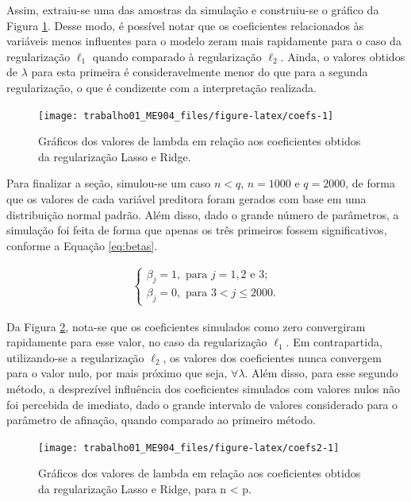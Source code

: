 \documentclass[
  12pt,
]{article}
\begin{document}
\quad Assim, extraiu-se uma das amostras da simulação e construiu-se o
gráfico da Figura \ref{fig:coefs}. Desse modo, é possível notar que os
coeficientes relacionados às variáveis menos influentes para o modelo
zeram mais rapidamente para o caso da regularização \(\ell_1\) quando
comparado à regularização \(\ell_2\). Ainda, o valores obtidos de
\(\lambda\) para esta primeira é consideravelmente menor do que para a
segunda regularização, o que é condizente com a interpretação realizada.

\begin{figure}

{\centering \texttt{[image: trabalho01\_ME904\_files/figure-latex/coefs-1]} 

}

\caption{Gráficos dos valores de lambda em relação aos coeficientes obtidos da regularização Lasso e Ridge.}\label{fig:coefs}
\end{figure}

\newpage

\quad Para finalizar a seção, simulou-se um caso \(n<q\), \(n = 1000\) e
\(q = 2000\), de forma que os valores de cada variável preditora foram
gerados com base em uma distribuição normal padrão. Além disso, dado o
grande número de parâmetros, a simulação foi feita de forma que apenas
os três primeiros fossem significativos, conforme a Equação
\ref{eq:betas}.

\begin{eqnarray}
\label{eq:betas}
\begin{cases}
\beta_j = 1, \text{ para } j = 1, 2 \text{ e } 3; \\
\beta_j = 0, \text{ para } 3 < j \leq 2000.
\end{cases}
\end{eqnarray}

\quad Da Figura \ref{fig:coefs2}, nota-se que os coeficientes simulados
como zero convergiram rapidamente para esse valor, no caso da
regularização \(\ell_1\). Em contrapartida, utilizando-se a
regularização \(\ell_2\), os valores dos coeficientes nunca convergem
para o valor nulo, por mais próximo que seja, \(\forall \lambda\). Além
disso, para esse segundo método, a desprezível influência dos
coeficientes simulados com valores nulos não foi percebida de imediato,
dado o grande intervalo de valores considerado para o parâmetro de
afinação, quando comparado ao primeiro método.

\begin{figure}

{\centering \texttt{[image: trabalho01\_ME904\_files/figure-latex/coefs2-1]} 

}

\caption{Gráficos dos valores de lambda em relação aos coeficientes obtidos da regularização Lasso e Ridge, para n < p.}\label{fig:coefs2}
\end{figure}
\end{document}
